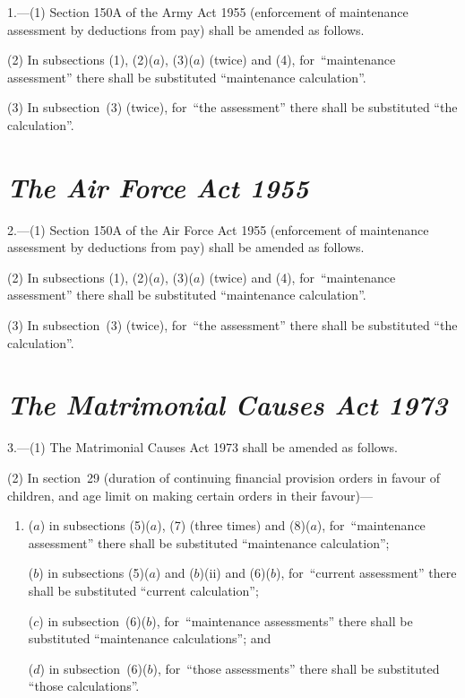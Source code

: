 \documentclass[12pt,a4paper]{article}
\begin{document}
1.---(1) Section 150A of the Army Act 1955 (enforcement of maintenance assessment by deductions from pay) shall be amended as follows.

(2) In subsections (1), (2)($a$), (3)($a$)  (twice) and (4), for~“maintenance assessment” there shall be substituted “maintenance calculation”.

(3) In subsection~(3)  (twice), for~“the assessment” there shall be substituted “the calculation”.


\section*{\itshape The Air Force Act 1955}

2.---(1) Section 150A of the Air Force Act 1955 (enforcement of maintenance assessment by deductions from pay) shall be amended as follows.

(2) In subsections (1), (2)($a$), (3)($a$)  (twice) and (4), for~“maintenance assessment” there shall be substituted “maintenance calculation”.

(3) In subsection~(3)  (twice), for~“the assessment” there shall be substituted “the calculation”.


\section*{\itshape The Matrimonial Causes Act 1973}

3.---(1) The Matrimonial Causes Act 1973 shall be amended as follows.

(2) In section~29 (duration of continuing financial provision orders in favour of children, and age limit on making certain orders in their favour)—
\begin{enumerate}\item[]
($a$) in subsections (5)($a$), (7)  (three times) and (8)($a$), for~“maintenance assessment” there shall be substituted “maintenance calculation”;

($b$) in subsections (5)($a$)  and ($b$)(ii)  and (6)($b$), for~“current assessment” there shall be substituted “current calculation”;

($c$) in subsection~(6)($b$), for~“maintenance assessments” there shall be substituted “maintenance calculations”; and

($d$) in subsection~(6)($b$), for~“those assessments” there shall be substituted “those calculations”.
\end{enumerate}
\end{document}
